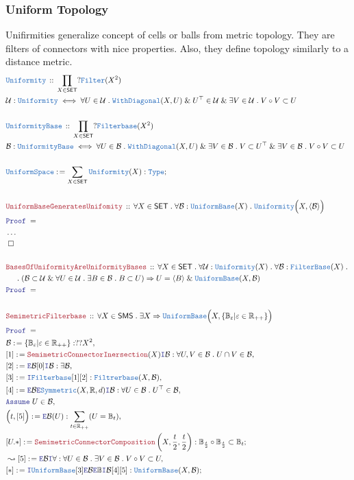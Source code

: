 \documentclass[12pt]{scrartcl}
\newcommand{\TYPE}[1]{\textcolor{NavyBlue}{\mathtt{#1}}}
\newcommand{\LOGIC}[1]{\textcolor{Blue}{\mathtt{#1}}}
\newcommand{\THM}[1]{\textcolor{Maroon}{\mathtt{#1}}}
\renewcommand{\.}{\; . \;}
\newcommand{\de}{: \kern 0.1pc =}
\newcommand{\Theorem}[2]{& \THM{#1} \, :: \, #2 \\ & \Proof = \\ }
\newcommand{\DeclareType}[2]{& \TYPE{#1} \, :: \, #2 \\}
\newcommand{\DefineType}[3]{& #1 : \TYPE{#2} \iff #3 \\}
\newcommand{\NewLine}{\\ & \kern 1pc}
\newcommand{\Page}[1]{ \begin{align*} #1 \end{align*}   }
\newcommand{\NoProof}{ & \ldots \\ \EndProof}
\renewcommand{\And}{\; \& \;}
\newcommand{\Imply}{\Rightarrow}
\newcommand{\Type}{\TYPE{Type}}
\newcommand{\Reals}{\mathbb{R} }
\newcommand{\Say}[3]{& #1 \de #2 : #3, \\}
\newcommand{\Conclude}[3]{& #1 \de #2 : #3; \\}
\newcommand{\Derive}[3]{& \leadsto #1 \de #2 : #3, \\}
\newcommand{\AssumeIn}[2]{& \LOGIC{Assume} \; #1 \in #2, \\}
\newcommand{\Intro}{\LOGIC{I}}
\newcommand{\Elim}{\LOGIC{E}}
\newcommand{\QED}{\; \square}
\newcommand{\EndProof}{& \QED \\}
\newcommand{\Proof}{\LOGIC{Proof} \; }
\newcommand{\B}{\mathcal{B}}
\newcommand{\SET}{\mathsf{SET}}
\renewcommand{\U}{\mathcal{U}}
\newcommand{\Cell}{\mathbb{B}}
\newcommand{\SMS}{\mathsf{SMS}}
\newcommand{\Unif}{\TYPE{Uniformity}}
\newcommand{\US}{\TYPE{UniformSpace}}
\newcommand{\UB}{\TYPE{UniformBase}}
\begin{document}
\subsubsection{Uniform Topology}
Unifirmities generalize concept of cells or balls from metric topology.
They are filters of connectors with nice properties.
Also, they define topology similarly to a distance metric.
\Page{
	\DeclareType{Uniformity}
	{
		\prod_{X \in \SET} ?\TYPE{Filter}(X^2)
	}
	\DefineType{\U}{Uniformity}
	{
		\forall U \in \U \.
		\TYPE{WithDiagonal}(X,U) \And U^\top \in \U \And
		\exists V \in \U \.  V \circ V \subset U 
	}
	\\
	\DeclareType{UniformityBase}
	{
		\prod_{X \in \SET} ?\TYPE{Filterbase}(X^2)
	}
	\DefineType{\B}{UniformityBase}
	{
		\forall U \in \B \.
		\TYPE{WithDiagonal}(X,U) \And \exists V \in \B \.  V \subset U^\top  \And
		\exists V \in \B \.  V \circ V \subset U 
	}
	\\
	\Conclude{\US}{\sum_{X \in \SET} \Unif(X) }{\Type}
	\\
	\Theorem{UniformBaseGeneratesUnifomity}
	{
		\forall X \in \SET \.
		\forall \B : \UB(X) \.
		\Unif\Big(X,\langle \B \rangle\Big)
	}
	\NoProof
	\\
	\Theorem{BasesOfUniformityAreUniformityBases}
	{
		\forall X \in \SET \.
		\forall \U : \Unif(X) \.
		\forall \B : \TYPE{FilterBase}(X) \. \NewLine \.
		(\B \subset \U \And 
		\forall U \in \U \. \exists B \in \B \. B \subset U )
		\Imply U = \langle B \rangle
		\And
		\UB(X,\B)
	}
	\\
	\Theorem{SemimetricFilterbase}
	{
		\forall X \in \SMS \.
		\exists X \Imply
		\UB\Big( X, \{ \Cell_\varepsilon | \varepsilon \in \Reals_{++}  \} \Big)
	}
	\Say{\B}{  \{ \Cell_\varepsilon | \varepsilon \in \Reals_{++}  \}  }{??X^2}
	\Say{[1]}{\THM{SemimetricConnectorInersection}(X)\Intro \B}
	{
		\forall U,V \in \B \. U \cap V \in \B
	}
	\Say{[2]}{\Elim \B [0]\Intro \B}{\exists \B}
	\Say{[3]}{\Intro \TYPE{Filterbase}[1][2]}{\TYPE{Filtrerbase}(X,\B)}
	\Say{[4]}{\Elim \B\Elim \TYPE{Symmetric}(X,\Reals,d)\Intro \B}
	{
		\forall U \in \B \. U^\top \in \B
	}
	\AssumeIn{U}{\B}
	\Say{\Big(t,[5]\Big)}{\Elim \B(U)}{\sum_{t \in \Reals_{++}} (U = \Cell_t)}
	\Conclude{[U.*]}
	{
		\THM{SemimetricConnectorComposition}\left(X,\frac{t}{2},\frac{t}{2}\right)	
	}
	{
		\Cell_{\frac{t}{2}} \circ \Cell_{\frac{t}{2}}
		\subset
		\Cell_{t}		
	}
	\Derive{[5]}{\Elim \B \Intro \forall}
	{
		\forall U \in \B \. \exists V \in \B \. V \circ V \subset U  
	}
	\Conclude{[*]}{\Intro \UB [3] \Elim \B \Elim \Cell \Intro \B [4][5]}
	{
		\UB(X,\B)
}}
\end{document}
